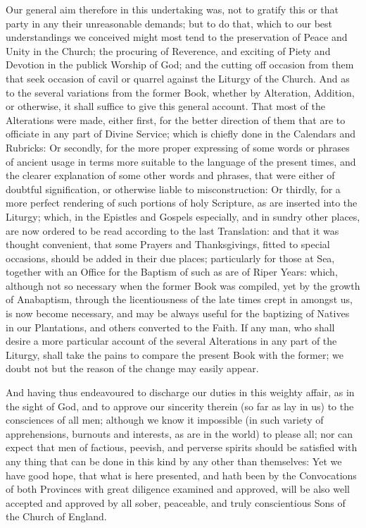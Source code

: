 Our general aim therefore in this undertaking was, not to gratify this or that party in any their unreasonable demands; but to do that, which to our best understandings we conceived might most tend to the preservation of Peace and Unity in the Church; the procuring of Reverence, and exciting of Piety and Devotion in the publick Worship of God; and the cutting off occasion from them that seek occasion of cavil or quarrel against the Liturgy of the Church. And as to the several variations from the former Book, whether by Alteration, Addition, or otherwise, it shall suffice to give this general account. That most of the Alterations were made, either first, for the better direction of them that are to officiate in any part of Divine Service; which is chiefly done in the Calendars and Rubricks: Or secondly, for the more proper expressing of some words or phrases of ancient usage in terms more suitable to the language of the present times, and the clearer explanation of some other words and phrases, that were either of doubtful signification, or otherwise liable to misconstruction: Or thirdly, for a more perfect rendering of such portions of holy Scripture, as are inserted into the Liturgy; which, in the Epistles and Gospels especially, and in sundry other places, are now ordered to be read according to the last Translation: and that it was thought convenient, that some Prayers and Thanksgivings, fitted to special occasions, should be added in their due places; particularly for those at Sea, together with an Office for the Baptism of such as are of Riper Years: which, although not so necessary when the former Book was compiled, yet by the growth of Anabaptism, through the licentiousness of the late times crept in amongst us, is now become necessary, and may be always useful for the baptizing of Natives in our Plantations, and others converted to the Faith. If any man, who shall desire a more particular account of the several Alterations in any part of the Liturgy, shall take the pains to compare the present Book with the former; we doubt not but the reason of the change may easily appear.

And having thus endeavoured to discharge our duties in this weighty affair, as in the sight of God, and to approve our sincerity therein (so far as lay in us) to the consciences of all men; although we know it impossible (in such variety of apprehensions, burnouts and interests, as are in the world) to please all; nor can expect that men of factious, peevish, and perverse spirits should be satisfied with any thing that can be done in this kind by any other than themselves: Yet we have good hope, that what is here presented, and hath been by the Convocations of both Provinces with great diligence examined and approved, will be also well accepted and approved by all sober, peaceable, and truly conscientious Sons of the Church of England.

\clearpage
